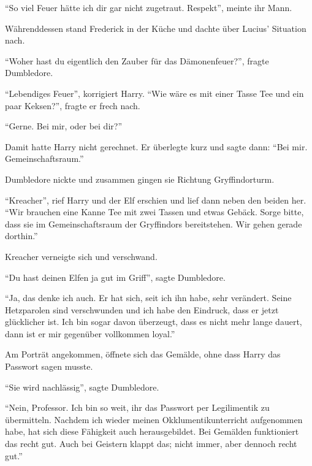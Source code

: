 \enquote{So viel Feuer hätte ich dir gar nicht zugetraut. Respekt}, meinte ihr Mann.

Währenddessen stand Frederick in der Küche und dachte über Lucius’ Situation nach. 

\trenn

\enquote{Woher hast du eigentlich den Zauber für das Dämonenfeuer?}, fragte Dumbledore.

\enquote{Lebendiges Feuer}, korrigiert Harry. \enquote{Wie wäre es mit einer Tasse Tee und ein paar Keksen?}, fragte er frech nach.

\enquote{Gerne. Bei mir, oder bei dir?}

Damit hatte Harry nicht gerechnet. Er überlegte kurz und sagte dann: \enquote{Bei mir. Gemeinschaftsraum.}

Dumbledore nickte und zusammen gingen sie Richtung Gryffindorturm.

\enquote{Kreacher}, rief Harry und der Elf erschien und lief dann neben den beiden her. \enquote{Wir brauchen eine Kanne Tee mit zwei Tassen und etwas Gebäck. Sorge bitte, dass sie im Gemeinschaftsraum der Gryffindors bereitstehen. Wir gehen gerade dorthin.}

Kreacher verneigte sich und verschwand.

\enquote{Du hast deinen Elfen ja gut im Griff}, sagte Dumbledore.

\enquote{Ja, das denke ich auch. Er hat sich, seit ich ihn habe, sehr verändert. Seine Hetzparolen sind verschwunden und ich habe den Eindruck, dass er jetzt glücklicher ist. Ich bin sogar davon überzeugt, dass es nicht mehr lange dauert, dann ist er mir gegenüber vollkommen loyal.}

Am Porträt angekommen, öffnete sich das Gemälde, ohne dass Harry das Passwort sagen musste.

\enquote{Sie wird nachlässig}, sagte Dumbledore.

\enquote{Nein, Professor. Ich bin so weit, ihr das Passwort per Legilimentik zu übermitteln. Nachdem ich wieder meinen Okklumentikunterricht aufgenommen habe, hat sich diese Fähigkeit auch herausgebildet. Bei Gemälden funktioniert das recht gut. Auch bei Geistern klappt das; nicht immer, aber dennoch recht gut.}

